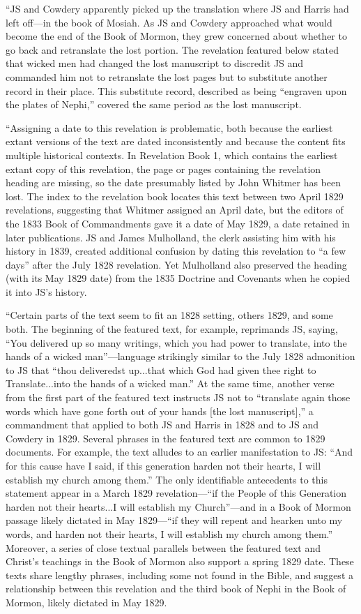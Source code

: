 			``JS and Cowdery apparently picked up the translation where JS and Harris had left off---in the book of Mosiah. As JS and Cowdery approached what would become the end of the Book of Mormon, they grew concerned about whether to go back and retranslate the lost portion. The revelation featured below stated that wicked men had changed the lost manuscript to discredit JS and commanded him not to retranslate the lost pages but to substitute another record in their place. This substitute record, described as being ``engraven upon the plates of Nephi,'' covered the same period as the lost manuscript.

			``Assigning a date to this revelation is problematic, both because the earliest extant versions of the text are dated inconsistently and because the content fits multiple historical contexts. In Revelation Book 1, which contains the earliest extant copy of this revelation, the page or pages containing the revelation heading are missing, so the date presumably listed by John Whitmer has been lost. The index to the revelation book locates this text between two April 1829 revelations, suggesting that Whitmer assigned an April date, but the editors of the 1833 Book of Commandments gave it a date of May 1829, a date retained in later publications. JS and James Mulholland, the clerk assisting him with his history in 1839, created additional confusion by dating this revelation to ``a few days'' after the July 1828 revelation. Yet Mulholland also preserved the heading (with its May 1829 date) from the 1835 Doctrine and Covenants when he copied it into JS's history.

			``Certain parts of the text seem to fit an 1828 setting, others 1829, and some both. The beginning of the featured text, for example, reprimands JS, saying, ``You delivered up so many writings, which you had power to translate, into the hands of a wicked man''---language strikingly similar to the July 1828 admonition to JS that ``thou deliveredst up...that which God had given thee right to Translate...into the hands of a wicked man.'' At the same time, another verse from the first part of the featured text instructs JS not to ``translate again those words which have gone forth out of your hands [the lost manuscript],'' a commandment that applied to both JS and Harris in 1828 and to JS and Cowdery in 1829. Several phrases in the featured text are common to 1829 documents. For example, the text alludes to an earlier manifestation to JS: ``And for this cause have I said, if this generation harden not their hearts, I will establish my church among them.'' The only identifiable antecedents to this statement appear in a March 1829 revelation---``if the People of this Generation harden not their hearts...I will establish my Church''---and in a Book of Mormon passage likely dictated in May 1829---``if they will repent and hearken unto my words, and harden not their hearts, I will establish my church among them.'' Moreover, a series of close textual parallels between the featured text and Christ's teachings in the Book of Mormon also support a spring 1829 date. These texts share lengthy phrases, including some not found in the Bible, and suggest a relationship between this revelation and the third book of Nephi in the Book of Mormon, likely dictated in May 1829.
			
